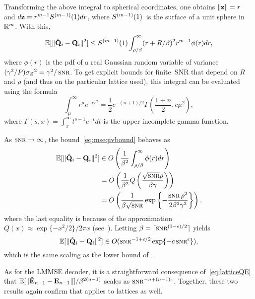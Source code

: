 Transforming the above integral to spherical coordinates, one obtains $\|\mathbf{z}\| =
r$ and $d\mathbf{z} = r^{m-1} S^{(m-1)}(1) dr$, where $S^{(m-1)}(1)$~is the surface of a unit sphere
in~$\mathbb{R}^m$.  With this, 
\begin{equation}
  \label{eq:mseqivbound}
  {\mathbb{E}[\|\hat{\mathbf{Q}}_i - \mathbf{Q}_i\|^2]} \le S^{(m-1)}(1) \int_{\rho/\beta}^\infty (r + R/\beta)^2 r^{m-1} \phi(r) dr,
\end{equation}
where $\phi(r)$ is the pdf of a real Gaussian random variable of variance
$(\gamma^2/P) \szq = \gamma^2/\snr$. To get explicit bounds for finite~SNR that
depend on $R$ and $\rho$ (and thus on the particular lattice used), this
integral can be evaluated using the formula
\begin{equation*}
  \int_\mu^\infty r^n e^{-c r^2} = \frac12 c^{-(n+1)/2} \Gamma\left(
  \frac{1+n}{2}, c \mu^2 \right),
\end{equation*}
where $\Gamma(s, x) = \int_x^\infty t^{s-1} e^{-t} dt$ is the upper incomplete
gamma function.

As $\snr \goesto \infty$, the bound~\eqref{eq:mseqivbound} behaves as
\begin{align*}
  \mseqiv &\in O\left( \frac{1}{\beta^2} \int_{\rho/\beta}^\infty \phi(r) dr 
  \right) \\
  &= O\left( \frac{1}{\beta^2} Q\left( \frac{\sqrt{\snr}\rho}{\beta\gamma}
  \right) \right) \\
  &= O\left( \frac{1}{\beta\sqrt{\snr}} \exp\left\{-\frac{\snr \rho^2}{2 \beta^2
  \gamma^2} \right\} \right),
\end{align*}
where the last equality is because of the approximation $Q(x) \approx
\exp\{-x^2/2\}/2\pi x$ (see~\cite[.12]{AbramowitzS1964}). Letting
$\beta = \lceil \snr^{(1-\e)/2} \rceil$ yields
\begin{equation*}
  \mseqiv \in O(\snr^{-1 + \e/2} \exp\{-c \snr^\e\}),
\end{equation*}
which is the same scaling as the lower bound of~.

As for the LMMSE decoder, it is a straightforward consequence
of~\eqref{eq:latticeQE} that $\mathbb{E}[\|\hat{\mathbf{E}}_{n-1} - \mathbf{E}_{n-1} \|] /
\beta^{2(n-1)}$ scales as $\snr^{-n+(n-1)\e}$. Together, these two results again
confirm that  applies to lattices as well.



